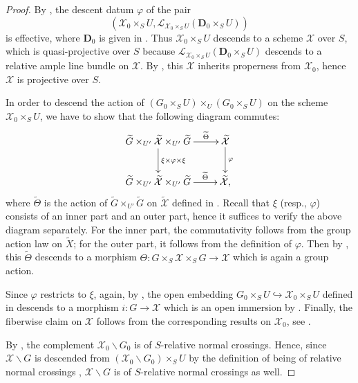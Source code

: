 \documentclass[11pt, reqno]{amsart}
\theoremstyle{plain}
\theoremstyle{definition}
\begin{document}
\begin{proof}
    By \cite[Section~6.1, Theorem~7]{BLR}, the descent datum $\varphi$ of the pair $$(\mathcal{X}_0\times_S U, \mathcal{L}_{\mathcal{X}_0 \times_S U}(\mathbf{D}_0\times_S U))$$
    is effective, where $\mathbf{D}_0$ is given in . Thus $\mathcal{X}_0\times_S U$ descends to a scheme $\mathcal{X}$ over $S$, which is quasi-projective over $S$ because $\mathcal{L}_{\mathcal{X}_0 \times_S U}(\mathbf{D}_0\times_S U)$ descends to a relative ample line bundle on $\mathcal{X}$. By \cite[Proposition~(2.7.1) (vii)]{EGAIV2}, this $\mathcal{X}$ inherits properness from $\mathcal{X}_0$, hence $\mathcal{X}$ is projective over $S$.

    In order to descend the action of $(G_0\times_S U)\times_U(G_0\times_S U)$ on the scheme $\mathcal{X}_0 \times_S U$, we have to show that the following diagram commutes:
    $$\xymatrix{
\widetilde{G}\times_{U'}\widetilde{\mathcal{X}}\times_{U'}\widetilde{G}  \ar[r]^-{\widetilde{\Theta}} \ar[d]^-{\xi\times\varphi\times\xi}  & \widetilde{\mathcal{X}} \ar[d]^-{\varphi}\\
\widetilde{G}\times_{U'}\widetilde{\mathcal{X}}\times_{U'}\widetilde{G}  \ar[r]^-{\widetilde{\Theta}}  & \widetilde{\mathcal{X}},
}
$$
where $\widetilde{\Theta}$ is the action of $\widetilde{G}\times_{U'}\widetilde{G}$ on $\widetilde{\mathcal{X}}$ defined in . Recall that $\xi$ (resp., $\varphi$) consists of an inner part and an outer part, hence it suffices to verify the above diagram separately. For the inner part, the commutativity follows from the group action law on $\widetilde{X}$; for the outer part, it follows from the definition of $\varphi$. Then by \cite[Section~6.1, Theorem~6 (a)]{BLR}, this $\widetilde{\Theta}$ descends to a morphism $\Theta\colon G\times_S\mathcal{X}\times_S G\longrightarrow \mathcal{X}$ which is again a group action.

Since $\varphi$ restricts to $\xi$, again, by \cite[Section~6.1, Theorem~6~(a)]{BLR}, the open embedding $G_0\times_S U\hookrightarrow \mathcal{X}_0\times_S U$ defined in  descends to a morphism $i\colon G \longrightarrow \mathcal{X}$ which is an open immersion by \cite[Proposition~2.7.1(x)]{EGAIV2}. Finally, the fiberwise claim on $\mathcal{X}$ follows from the corresponding results on $\mathcal{X}_0$, see . 

By , the complement $\mathcal{X}_0\backslash G_0$ is of $S$-relative normal crossings. Hence, since $\mathcal{X}\backslash G$ is descended from $(\mathcal{X}_0\backslash G_0)\times_S U$ by the definition of being of relative normal crossings \cite[exposé~XIII, 2.1]{SGA1}, $\mathcal{X}\backslash G$ is of $S$-relative normal crossings as well.
\end{proof}
\end{document}
